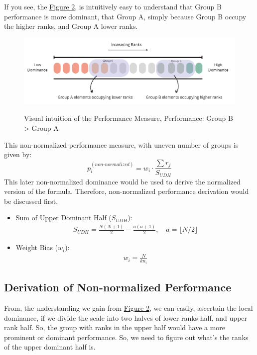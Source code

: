 \documentclass[man,floatsintext]{apa7}
\begin{document}
If you see, the \hyperref[fig:dominance_Understanding]{Figure 2}, is intuitively easy to understand that Group B performance is more dominant, that Group A, simply because Group B occupy the higher ranks, and Group A lower ranks.
\begin{figure}[!htb]
    \caption{Visual intuition of the Performance Measure, Performance: Group B > Group A}
    \centering
    \includegraphics[scale=0.65]{images/dominance-intuition.png}
    \label{fig:dominance_Understanding}
\end{figure}

This non-normalized performance measure, with uneven number of groups is given by:
\begin{equation}
\label{eq:non-normalized}
    p_i^{(non\text{-}normalized)} = w_i \cdot \frac{\sum r_j}{ S_{UDH} }
\end{equation}
This later non-normalized dominance would be used to derive the normalized version of the formula. Therefore, non-normalized performance derivation would be discussed first.

\begin{itemize}
    \item Sum of Upper Dominant Half ($S_{UDH}$):
    \begin{align}
        S_{UDH} = \frac{N(N+1)}{2} - \frac{a(a+1)}{2}, \quad a = \lfloor N/2 \rfloor
    \end{align}
    \item Weight Bias ($w_i$):
    \begin{align}
        w_i = \frac{N}{k n_i}
    \end{align}
\end{itemize}

\subsection{Derivation of Non-normalized Performance}
From, the understanding we gain from \hyperref[fig:dominance_Understanding]{Figure 2}, we can easily, ascertain the local dominance, if we divide the scale into two halves of lower ranks half, and upper rank half. So, the group with ranks in the upper half would have a more prominent or dominant performance. So, we need to figure out what's the ranks of the upper dominant half is.
\end{document}
